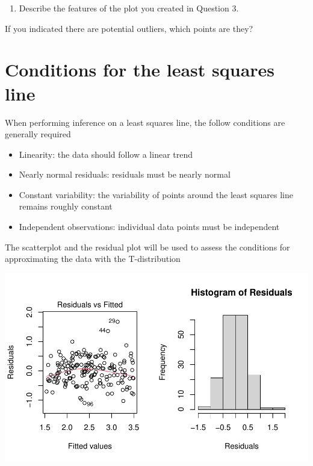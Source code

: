 \documentclass[
]{report}
\providecommand{\tightlist}{%
  \setlength{\itemsep}{0pt}\setlength{\parskip}{0pt}}
\begin{document}
\begin{enumerate}
\def\labelenumi{\arabic{enumi}.}
\setcounter{enumi}{3}
\tightlist
\item
  Describe the features of the plot you created in Question 3.
\end{enumerate}

\vspace{1in}

If you indicated there are potential outliers, which points are they?

\hypertarget{conditions-for-the-least-squares-line}{%
\section{Conditions for the least squares line}\label{conditions-for-the-least-squares-line}}

When performing inference on a least squares line, the follow conditions are generally required

\begin{itemize}
\tightlist
\item
  Linearity: the data should follow a linear trend
\item
  Nearly normal residuals: residuals must be nearly normal
\item
  Constant variability: the variability of points around the least squares line remains roughly constant
\item
  Independent observations: individual data points must be independent
\end{itemize}

The scatterplot and the residual plot will be used to assess the conditions for approximating the data with the T-distribution

\begin{center}\includegraphics[width=0.7\linewidth]{10-regression_files/figure-latex/unnamed-chunk-3-1} \end{center}
\end{document}
